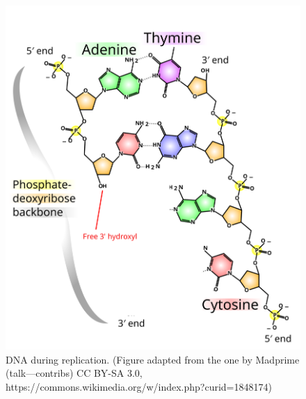 \documentclass[]{krantz}
\begin{document}
\begin{figure}

{\centering \includegraphics{figs/DNA_chemical_structure_2} 

}

\caption{DNA during replication. (Figure adapted from the one by Madprime (talk---contribs)  CC BY-SA 3.0, https://commons.wikimedia.org/w/index.php?curid=1848174)}\label{fig:dna-copying}
\end{figure}
\end{document}
